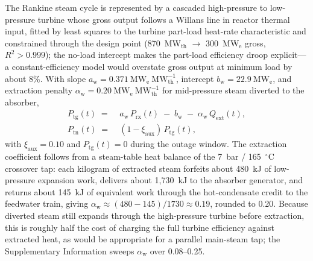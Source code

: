 \documentclass[a4paper,fleqn]{cas-sc}
\begin{document}
The Rankine steam cycle is represented by a cascaded high-pressure to low-pressure turbine whose gross output follows a Willans line in reactor thermal input, fitted by least squares to the turbine part-load heat-rate characteristic and constrained through the design point (870~MW$_\mathrm{th}$ $\rightarrow$ 300~MW$_\mathrm{e}$ gross, $R^2>0.999$); the no-load intercept makes the part-load efficiency droop explicit---a constant-efficiency model would overstate gross output at minimum load by about 8\%. With slope $a_\mathrm{w}=0.371~\mathrm{MW}_\mathrm{e}~\mathrm{MW}_\mathrm{th}^{-1}$, intercept $b_\mathrm{w}=22.9~\mathrm{MW}_\mathrm{e}$, and extraction penalty $\alpha_\mathrm{w}=0.20~\mathrm{MW}_\mathrm{e}~\mathrm{MW}_\mathrm{th}^{-1}$ for mid-pressure steam diverted to the absorber,
\begin{align}
P_\mathrm{tg}(t) \;=\; & a_\mathrm{w}\, P_\mathrm{rx}(t) \;-\; b_\mathrm{w} \;-\; \alpha_\mathrm{w}\, Q_\mathrm{ext}(t), \label{eq:turb_willans}\\
P_\mathrm{tn}(t) \;=\; & (1 - \xi_\mathrm{aux})\, P_\mathrm{tg}(t), \label{eq:turb_aux}
\end{align}
with $\xi_\mathrm{aux}=0.10$ and $P_\mathrm{tg}(t)=0$ during the outage window. The extraction coefficient follows from a steam-table heat balance of the 7~bar / 165~$^\circ$C crossover tap: each kilogram of extracted steam forfeits about 480~kJ of low-pressure expansion work, delivers about 1{,}730~kJ to the absorber generator, and returns about 145~kJ of equivalent work through the hot-condensate credit to the feedwater train, giving $\alpha_\mathrm{w} \approx (480-145)/1730 \approx 0.19$, rounded to 0.20. Because diverted steam still expands through the high-pressure turbine before extraction, this is roughly half the cost of charging the full turbine efficiency against extracted heat, as would be appropriate for a parallel main-steam tap; the Supplementary Information sweeps $\alpha_\mathrm{w}$ over 0.08--0.25.
\end{document}
